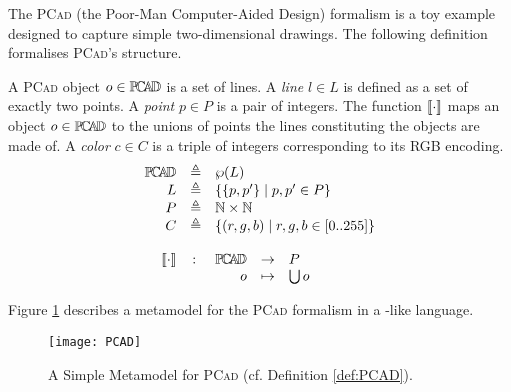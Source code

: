 
The \textsc{PCad} (the Poor-Man Computer-Aided Design) formalism is a toy 
example designed to capture simple two-dimensional drawings. The following 
definition formalises \textsc{PCad}'s structure.

\begin{Definition}
   A \textsc{PCad} object $o\in \mathbb{P}\!\mathbb{C}\!\mathbb{A}\!\mathbb{D} $ is a set of lines. A \emph{line} $l 
\in L$ is defined as a set of exactly two points. A \emph{point} $p\in P$ is a 
pair of integers. The function $\llbracket \cdot \rrbracket$ maps an object $o\in \mathbb{P}\!\mathbb{C}\!\mathbb{A}\!\mathbb{D} $ to the 
unions of points the lines constituting the objects are made of. A \emph{color} 
$c\in C$ is a triple of integers corresponding to its RGB encoding.
\begin{displaymath}
   \begin{array}{rcl}
      \PCAD &\eqdef& \wp(L)\\
      L     &\eqdef& \{ \{p, p'\} \;|\; p, p' \in P \}\\
      P     &\eqdef& \mathbb{N} \times \mathbb{N}\\
      C     &\eqdef& \{ (r, g, b) \;|\; r, g, b \in [0..255] \}\\
      \\
      \SMapping & \colon & \!\!\!\begin{array}[t]{rcl}
         \PCAD &\to& P\\
         o &\mapsto& \bigcup o
      \end{array}
   \end{array}
\end{displaymath}
\end{Definition}
Figure \ref{fig:PCAD} describes a metamodel for the \textsc{PCad} formalism in 
a \MOF-like language. 

\begin{figure}[t]
   \centering
   \texttt{[image: PCAD]}
   \caption{A Simple Metamodel for \textsc{PCad} (cf. Definition 
\ref{def:PCAD}).}%
   \label{fig:PCAD}%
\end{figure}



